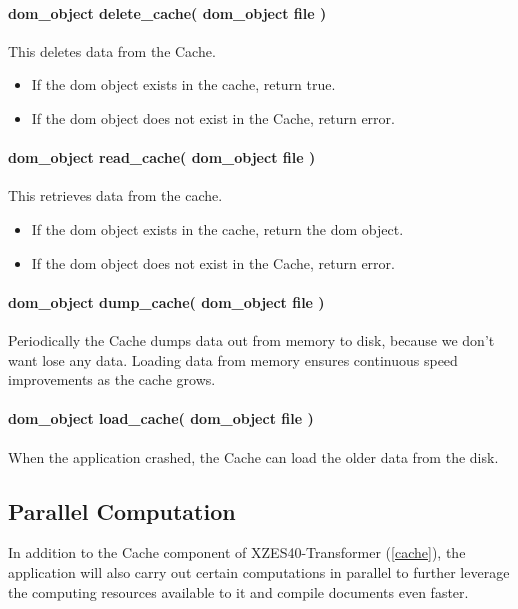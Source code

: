 \paragraph{dom\_object delete\_cache( dom\_object file )}
This deletes data from the Cache.

\begin{itemize}
    \item If the \gls{dom} object exists in the cache, return true.
    \item If the \gls{dom} object does not exist in the Cache, return error.
\end{itemize}

\paragraph{dom\_object read\_cache( dom\_object file )} 
This retrieves data from the cache.

\begin{itemize}
    \item If the \gls{dom} object exists in the cache, return the \gls{dom} object.
    \item If the \gls{dom} object does not exist in the Cache, return error.
\end{itemize}

\paragraph{dom\_object dump\_cache( dom\_object file )} 
Periodically the Cache dumps data out from memory to disk, because we don't want lose any data.
Loading data from memory ensures continuous speed improvements as the cache grows.

\paragraph{dom\_object load\_cache( dom\_object file )} 
When the application crashed, the Cache can load the older data from the disk.

\subsection{Parallel Computation}
\label{parallel-computation}

In addition to the Cache component of XZES40-Transformer (\ref{cache}), the application will also carry out certain computations in parallel to further leverage the computing resources available to it and compile documents even faster.

